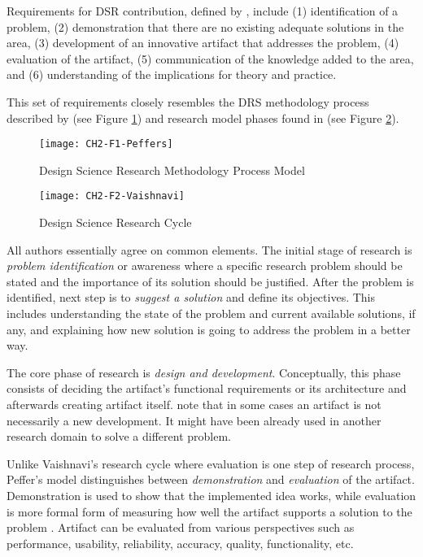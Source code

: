 Requirements for DSR contribution, defined by \citet{March2008}, include (1)
identification of a problem, (2) demonstration that there are no existing
adequate solutions in the area, (3) development of an innovative artifact that
addresses the problem, (4) evaluation of the artifact, (5) communication of the
knowledge added to the area, and (6) understanding of the implications for
theory and practice.

This set of requirements closely resembles the DRS methodology process described
by \citet{Peffers2008} (see Figure \ref{fig:peffers}) and research model phases
found in \citet{Vaishnavi2007} (see Figure \ref{fig:vaishnavi}).

\begin{figure}[h!]
\centering
\texttt{[image: CH2-F1-Peffers]}
\caption[Design Science Research Methodology Process Model]{Design Science
Research Methodology Process Model \citep{Peffers2008}}
\label{fig:peffers}
\end{figure}

\FloatBarrier

\begin{figure}[htp]
\centering
\texttt{[image: CH2-F2-Vaishnavi]}
\caption[Design Science Reseach Cycle]{Design Science Research Cycle
\citep{Vaishnavi2007}}
\label{fig:vaishnavi}
\end{figure}

All authors essentially agree on common elements. The initial stage of research
is \textit{problem identification} or awareness where a specific research
problem should be stated and the importance of its solution should be justified.
After the problem is identified, next step is to \textit{suggest a solution} and
define its objectives. This includes understanding the state of the problem and
current available solutions, if any, and explaining how new solution is going to
address the problem in a better way. 

\FloatBarrier

The core phase of research is \textit{design and development}. Conceptually,
this phase consists of deciding the artifact's functional requirements or its
architecture and afterwards creating artifact itself. \citet{Peffers2008} note
that in some cases an artifact is not necessarily a new development. It might
have been already used in another research domain to solve a different problem.

Unlike Vaishnavi's research cycle where evaluation is one step of research
process, Peffer's model distinguishes between \textit{demonstration} and
\textit{evaluation} of the artifact. Demonstration is used to show that the
implemented idea works, while evaluation is more formal form of measuring how
well the artifact supports a solution to the problem \citep{Peffers2008}.
Artifact can be evaluated from various perspectives such as performance,
usability, reliability, accuracy, quality, functionality, etc.

